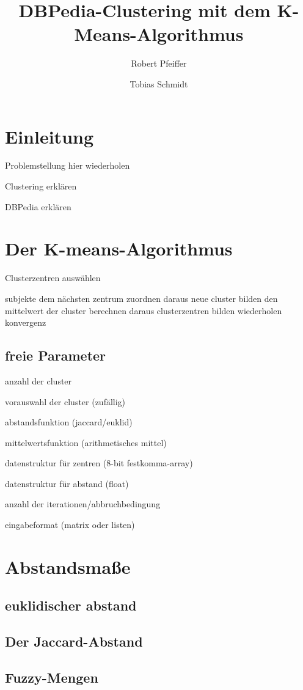 \documentclass[a4paper,12pt]{article}
\title{DBPedia-Clustering mit dem K-Means-Algorithmus}
\author{Robert Pfeiffer \and Tobias Schmidt}
\begin{document}
\maketitle
\section{Einleitung}
Problemstellung hier wiederholen

Clustering erklären

DBPedia erklären

\section{Der K-means-Algorithmus}

Clusterzentren auswählen

subjekte dem nächsten zentrum zuordnen
daraus neue cluster bilden
den mittelwert der cluster berechnen
daraus clusterzentren bilden
wiederholen
konvergenz

\subsection{freie Parameter}
anzahl der cluster

vorauswahl der cluster (zufällig)

abstandsfunktion (jaccard/euklid)

mittelwertsfunktion (arithmetisches mittel)

datenstruktur für zentren (8-bit festkomma-array)

datenstruktur für abstand (float)

anzahl der iterationen/abbruchbedingung

eingabeformat (matrix oder listen)

\section{Abstandsmaße}
\subsection{euklidischer abstand}
\subsection{Der Jaccard-Abstand}
\subsection{Fuzzy-Mengen}
\end{document}
